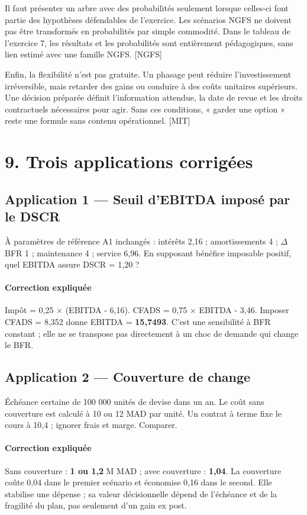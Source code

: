 \documentclass[12pt,a4paper]{article}
\begin{document}
Il faut présenter un arbre avec des probabilités seulement lorsque celles-ci font partie des hypothèses défendables de l’exercice. Les scénarios NGFS ne doivent pas être transformés en probabilités par simple commodité. Dans le tableau de l’exercice 7, les résultats et les probabilités sont entièrement pédagogiques, sans lien estimé avec une famille NGFS. [NGFS]


Enfin, la flexibilité n’est pas gratuite. Un phasage peut réduire l’investissement irréversible, mais retarder des gains ou conduire à des coûts unitaires supérieurs. Une décision préparée définit l’information attendue, la date de revue et les droits contractuels nécessaires pour agir. Sans ces conditions, « garder une option » reste une formule sans contenu opérationnel. [MIT]

\section*{9. Trois applications corrigées}

\subsection*{Application 1 --- Seuil d’EBITDA imposé par le DSCR}
À paramètres de référence A1 inchangés : intérêts 2,16 ; amortissements 4 ; $\Delta$BFR 1 ; maintenance 4 ; service 6,96. En supposant bénéfice imposable positif, quel EBITDA assure DSCR = 1,20 ?


\paragraph{Correction expliquée}
Impôt = 0,25 $\times$ (EBITDA - 6,16). CFADS = 0,75 $\times$ EBITDA - 3,46. Imposer CFADS = 8,352 donne EBITDA = \textbf{15,7493}. C’est une sensibilité à BFR constant ; elle ne se transpose pas directement à un choc de demande qui change le BFR.



\subsection*{Application 2 --- Couverture de change}
Échéance certaine de 100 000 unités de devise dans un an. Le coût sans couverture est calculé à 10 ou 12 MAD par unité. Un contrat à terme fixe le cours à 10,4 ; ignorer frais et marge. Comparer.


\paragraph{Correction expliquée}
Sans couverture : \textbf{1 ou 1,2} M MAD ; avec couverture : \textbf{1,04}. La couverture coûte 0,04 dans le premier scénario et économise 0,16 dans le second. Elle stabilise une dépense ; sa valeur décisionnelle dépend de l’échéance et de la fragilité du plan, pas seulement d’un gain ex post.
\end{document}
